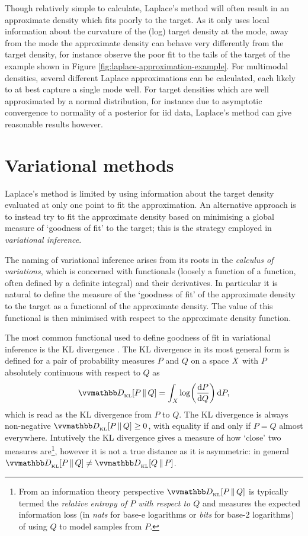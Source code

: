 Though relatively simple to calculate, Laplace's method will often result in an approximate density which fits poorly to the target. As it only uses local information about the curvature of the (log) target density at the mode, away from the mode the approximate density can behave very differently from the target density, for instance observe the poor fit to the tails of the target of the example shown in Figure \ref{fig:laplace-approximation-example}. For multimodal densities, several different Laplace approximations can be calculated, each likely to at best capture a single mode well. For target densities which are well approximated by a normal distribution, for instance due to asymptotic convergence to normality of a posterior for \ac{iid} data, Laplace's method can give reasonable results however. 

\section{Variational methods}

Laplace's method is limited by using information about the target density evaluated at only one point to fit the approximation. An alternative approach is to instead try to fit the approximate density based on minimising a global measure of `goodness of fit' to the target; this is the strategy employed in \emph{variational inference}.

The naming of variational inference arises from its roots in the \emph{calculus of variations}, which is concerned with functionals (loosely a function of a function, often defined by a definite integral) and their derivatives. In particular it is natural to define the measure of the `goodness of fit' of the approximate density to the target as a functional of the approximate density. The value of this functional is then minimised with respect to the approximate density function. 

The most common functional used to define goodness of fit in variational inference is the \ac{KL} divergence \citep{kullback1951information}. The \ac{KL} divergence in its most general form is defined for a pair of probability measures $P$ and $Q$ on a space $\mathit{X}$ with $P$ absolutely continuous with respect to $Q$ as
\begin{equation}\label{eq:kullback-leibler-probability-measures}
  \kldiv{P}{Q} =
  \int_{\set{X}} \log\lpa\td{P}{Q}\rpa \,\dr P,
\end{equation}
which is read as the \ac{KL} divergence from $P$ to $Q$. The \ac{KL} divergence is always non-negative $\kldiv{P}{Q} \geq 0$, with equality if and only if $P = Q$ almost everywhere. Intutively the \ac{KL} divergence gives a measure of how `close' two measures are\footnote{From an information theory perspective $\kldiv{P}{Q}$ is typically termed the \emph{relative entropy of $P$ with respect to $Q$} and measures the expected information loss (in \emph{nats} for base-$\mathrm{e}$ logarithms or \emph{bits} for base-2 logarithms) of using $Q$ to model samples from $P$.}, however it is not a true distance as it is asymmetric: in general $\kldiv{P}{Q} \neq \kldiv{Q}{P}$.

